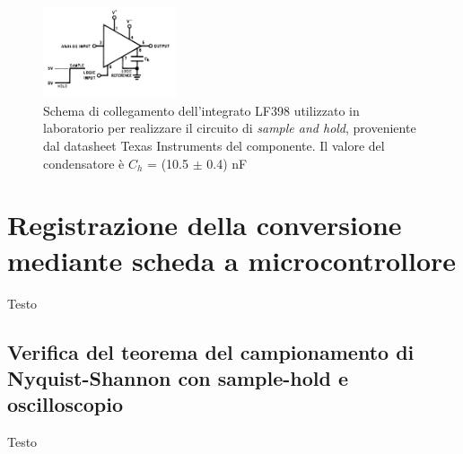 \documentclass[journal]{IEEEtran}
\begin{document}
\begin{figure}[H]%
\begin{center}
\includegraphics[width=0.35\textwidth]{sch-simulations/digital/output/lf398.png}
\caption{Schema di collegamento dell'integrato LF398 utilizzato in laboratorio per realizzare il circuito di \textit{sample and hold}, proveniente dal datasheet Texas Instruments del componente. Il valore del condensatore è $C_h$ = (10.5 $\pm$ 0.4) nF}
\label{fig:circuit_sample_and_hold}
\end{center}
\end{figure}

\section{Registrazione della conversione mediante scheda a microcontrollore}
Testo

\subsection{Verifica del teorema del campionamento di Nyquist-Shannon con sample-hold e oscilloscopio}
Testo
\end{document}
